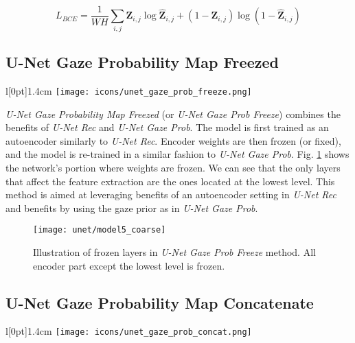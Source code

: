 \endgroup
\begin{equation}
L_{BCE} = \frac{1}{W H} \sum_{i,j} \boldsymbol{Z}_{i,j} \log{\boldsymbol{\hat{Z}}_{i,j}} + (1-\boldsymbol{Z}_{i,j}) \log{(1-\boldsymbol{\hat{Z}}_{i,j})}
\label{eq:mse_gaze_prob_loss}
\end{equation}
\hspace{6pt}

\clearpage
\subsection{U-Net Gaze Probability Map Freezed}
\begingroup
\setlength\intextsep{0pt}
\begin{wrapfigure}[4]{l}[0pt]{1.4cm}
\texttt{[image: icons/unet\_gaze\_prob\_freeze.png]}
\end{wrapfigure}

\textit{U-Net Gaze Probability Map Freezed} (or \textit{U-Net Gaze Prob Freeze}) combines the benefits of \textit{U-Net Rec} and \textit{U-Net Gaze Prob}. The model is first trained as an autoencoder similarly to \textit{U-Net Rec}. Encoder weights are then frozen (or fixed), and the model is re-trained in a similar fashion to \textit{U-Net Gaze Prob}. Fig. \ref{fig:model_freeze} shows the network's portion where weights are frozen. We can see that the only layers that affect the feature extraction are the ones located at the lowest level. This method is aimed at leveraging benefits of an autoencoder setting in \textit{U-Net Rec} and benefits by using the gaze prior as in \textit{U-Net Gaze Prob}.

\endgroup

\begin{figure}[htbp]
  \centering
  \texttt{[image: unet/model5\_coarse]}
  \caption[Modified U-Net with freezed encoder part]{Illustration of frozen layers in \textit{U-Net Gaze Prob Freeze} method. All encoder part except the lowest level is frozen.}
  \label{fig:model_freeze}
\end{figure}

\subsection{U-Net Gaze Probability Map Concatenate} \label{unet_gaze_prob_concat}
\begingroup
\setlength\intextsep{0pt}
\begin{wrapfigure}[4]{l}[0pt]{1.4cm}
\texttt{[image: icons/unet\_gaze\_prob\_concat.png]}
\end{wrapfigure}

